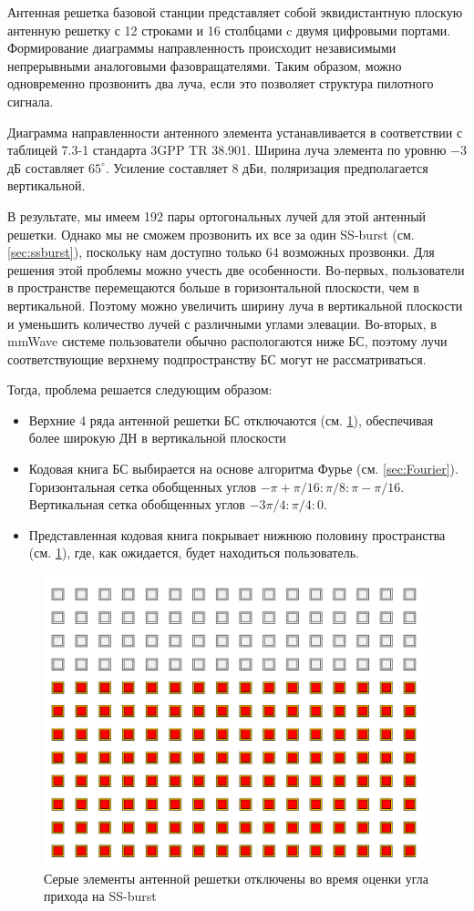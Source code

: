 Антенная решетка базовой станции представляет собой эквидистантную плоскую
антенную решетку с 12 строками и 16 столбцами c двумя цифровыми портами.
Формирование диаграммы направленность происходит независимыми непрерывными
аналоговыми фазовращателями. Таким образом, можно одновременно прозвонить два
луча, если это позволяет структура пилотного сигнала.

Диаграмма направленности антенного элемента устанавливается в соответствии с
таблицей 7.3-1 стандарта 3GPP TR 38.901. Ширина луча элемента по уровню $-3$ дБ
составляет $65^\circ$. Усиление составляет 8 дБи, поляризация предполагается вертикальной.

В результате, мы имеем 192 пары ортогональных лучей для этой антенный решетки.
Однако мы не сможем прозвонить их все за один SS-burst (см. \ref{sec:ssburst}),
поскольку нам доступно только 64 возможных прозвонки. Для решения этой проблемы
можно учесть две особенности.  Во-первых, пользователи в пространстве перемещаются больше в
горизонтальной плоскости, чем в вертикальной. Поэтому можно увеличить ширину
луча в вертикальной плоскости и уменьшить количество лучей с различными углами
элевации.  Во-вторых, в mmWave системе пользователи обычно распологаются ниже
БС, поэтому лучи соответствующие верхнему подпространству БС могут не
рассматриваться.

Тогда, проблема решается следующим образом:
\begin{itemize}
    \item Верхние 4 ряда антенной решетки БС отключаются (см. \ref{fig:4.6}), обеспечивая более широкую ДН в вертикальной плоскости
    \item Кодовая книга БС выбирается на основе алгоритма Фурье (см.
    \ref{sec:Fourier}). Горизонтальная сетка обобщенных углов $-\pi +
    \pi/16:\pi/8:\pi-\pi/16$.
          Вертикальная сетка обобщенных углов $-3\pi/4:\pi/4:0$.
    \item Представленная кодовая книга покрывает нижнюю половину пространства (см. \ref{fig:4.6}), где, как ожидается, будет находиться пользователь.
\end{itemize}

\begin{figure}[h!]
    \centering
    \includegraphics[width=0.35\linewidth]{figs/fig4.5.png}
    \caption{Серые элементы антенной решетки отключены во время оценки угла прихода на SS-burst}
    \label{fig:4.6}
\end{figure}

